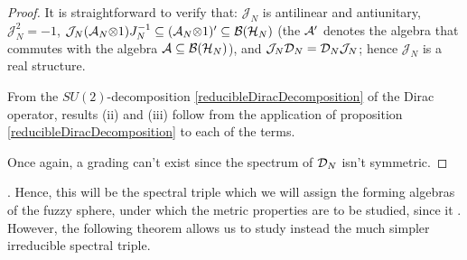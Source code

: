 \begin{proof}
It is straightforward to verify that: $\mathcal J_N$ is antilinear and antiunitary, $\mathcal J_N^2 = - 1$, $\mathcal J_N (\mathcal A_N \mathcal\otimes 1) J_N^{-1} \subseteq (\mathcal A_N \mathcal\otimes 1)' \subseteq \mathcal B(\mathcal H_N)$ (the $\mathcal A '$ denotes the algebra that commutes with the algebra $\mathcal A \subseteq \mathcal B(\mathcal H_N)$), and $\mathcal J_N \mathcal D_N = \mathcal D_N \mathcal J_N$; hence $\mathcal J_N$ is a real structure.

From the $SU(2)$-decomposition \eqref{reducibleDiracDecomposition} of the Dirac operator, results (ii) and (iii) follow from the application of proposition \ref{reducibleDiracDecomposition} to each of the terms.

Once again, a grading can't exist since the spectrum of $\mathcal D_N$ isn't symmetric.
\end{proof}

. { \color{gray}
} Hence, this will be the spectral triple which we will assign the forming algebras of the fuzzy sphere, under which the metric properties are to be studied, since it . However, the following theorem allows us to study instead the much simpler irreducible spectral triple.

